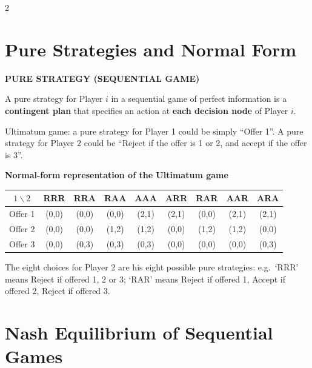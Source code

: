 \documentclass[a4paper,9pt]{extarticle}
\begin{document}
\begin{multicols}{2}
\section{Pure Strategies and Normal Form}


\begin{definition}

\textbf{PURE STRATEGY (SEQUENTIAL GAME)}

A pure strategy for Player $i$ in a sequential game of perfect information is a
\textbf{contingent plan} that specifies an action at \textbf{each decision node} of
Player $i$.

\end{definition}


\begin{example}

Ultimatum game: a pure strategy for Player 1 could be simply ``Offer 1''. A pure strategy for
Player 2 could be ``Reject if the offer is 1 or 2, and accept if the offer is 3''.

\end{example}


\textbf{Normal-form representation of the Ultimatum game}

\begin{center}
\footnotesize
\setlength{\tabcolsep}{2pt}
\begin{tabular}{c|cccccccc}
$1 \backslash 2$ & RRR & RRA & RAA & AAA & ARR & RAR & AAR & ARA \\
\hline
Offer 1 & (0,0) & (0,0) & (0,0) & (2,1) & (2,1) & (0,0) & (2,1) & (2,1) \\
Offer 2 & (0,0) & (0,0) & (1,2) & (1,2) & (0,0) & (1,2) & (1,2) & (0,0) \\
Offer 3 & (0,0) & (0,3) & (0,3) & (0,3) & (0,0) & (0,0) & (0,0) & (0,3) \\
\end{tabular}
\end{center}


The eight choices for Player 2 are his eight possible pure strategies: e.g.\ `RRR' means
Reject if offered 1, 2 or 3; `RAR' means Reject if offered 1, Accept if offered 2, Reject if
offered 3.



\section{Nash Equilibrium of Sequential Games}



\end{multicols}
\end{document}
